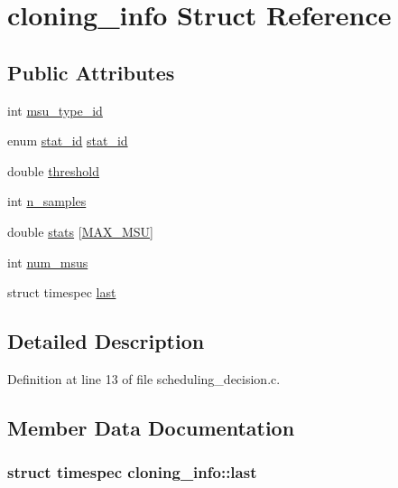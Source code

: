 \hypertarget{structcloning__info}{\section{cloning\-\_\-info Struct Reference}
\label{structcloning__info}
}
\subsection*{Public Attributes}
\begin{DoxyCompactItemize}
\item 
int \hyperlink{structcloning__info_a33d2da60c6da8d63787ccd31abb1dcd2}{msu\-\_\-type\-\_\-id}
\item 
enum \hyperlink{stat__ids_8h_ac210bd14ba53357098c0b3ebdd69784e}{stat\-\_\-id} \hyperlink{structcloning__info_ae9b537be6398899a7e53f694445bc867}{stat\-\_\-id}
\item 
double \hyperlink{structcloning__info_a8921289494a18492f6db5396e36fda15}{threshold}
\item 
int \hyperlink{structcloning__info_a40588709a6807365c9d2a8554f08054d}{n\-\_\-samples}
\item 
double \hyperlink{structcloning__info_ae5a0cd5ac7c7fdce2c04cf7f18b1e867}{stats} \mbox{[}\hyperlink{dfg_8h_ae4dc3586073212cd441edfe4134132f3}{M\-A\-X\-\_\-\-M\-S\-U}\mbox{]}
\item 
int \hyperlink{structcloning__info_a0d133d4ff8e0148eee7cda34b3e5627f}{num\-\_\-msus}
\item 
struct timespec \hyperlink{structcloning__info_aa59abaec6058e1037d9b0b9899dc2475}{last}
\end{DoxyCompactItemize}


\subsection{Detailed Description}


Definition at line 13 of file scheduling\-\_\-decision.\-c.



\subsection{Member Data Documentation}
\hypertarget{structcloning__info_aa59abaec6058e1037d9b0b9899dc2475}{
\subsubsection[{last}]{\setlength{\rightskip}{0pt plus 5cm}struct timespec cloning\-\_\-info\-::last}}\label{structcloning__info_aa59abaec6058e1037d9b0b9899dc2475}


